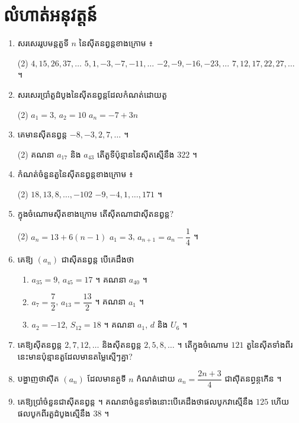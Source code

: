 \section*{លំហាត់អនុវត្តន៍}
\begin{enumerate}[1]
  \item សរសេររូបមន្តតួទី $n$ នៃស៊ីតនព្វន្តខាងក្រោម ៖
  \begin{tasks}(2)
    \task $4, 15, 26, 37, \ldots$
    \task $5, 1, -3, -7, -11, \ldots$
    \task $-2, -9, -16, -23, \ldots$
    \task $7, 12, 17, 22, 27, \ldots$ ។
  \end{tasks}
  \item សរសេរប្រាំតួដំបូងនៃស៊ីតនព្វន្តដែលកំណត់ដោយតួ
  \begin{tasks}(2)
    \task $a_1 = 3$, $a_2 = 10$
    \task $a_n = -7 + 3n$
  \end{tasks}
  \item គេមានស៊ីតនព្វន្ត $-8, -3, 2, 7, \ldots$ ។
  \begin{tasks}(2)
    \task គណនា $a_{17}$ និង $a_{43}$
    \task តើតួទីប៉ុន្មាននៃស៊ីតស្មើនឹង $322$ ។
  \end{tasks}
  \item កំណត់ចំនួនតួនៃស៊ីតនព្វន្តខាងក្រោម ៖
  \begin{tasks}(2)
    \task $18, 13, 8, \ldots, -102$
    \task $-9, -4, 1, \ldots, 171$ ។
  \end{tasks}
  \item ក្នុងចំណោមស៊ីតខាងក្រោម តើស៊ីតណាជាស៊ីតនព្វន្ត?
  \begin{tasks}(2)
    \task $a_n = 13 + 6(n - 1)$
    \task $a_1 = 3$, $a_{n+1} = a_n - \dfrac{1}{4}$ ។
  \end{tasks}
  \item គេឱ្យ $(a_n)$ ជាស៊ីតនព្វន្ត បើគេដឹងថា
  \begin{enumerate}[a]
    \item $a_{35} = 9$, $a_{45} = 17$ ។ គណនា $a_{40}$ ។
    \item $a_7 = \dfrac{7}{2}$, $a_{13} = \dfrac{13}{2}$ ។ គណនា $a_1$ ។
    \item $a_2 = -12$, $S_{12} = 18$ ។ គណនា $a_1$, $d$ និង $U_6$ ។
  \end{enumerate}
  \item គេឱ្យស៊ីតនព្វន្ត $2, 7, 12, \ldots$ និងស៊ីតនព្វន្ត $2, 5, 8, \ldots$ ។ តើក្នុងចំណោម $121$ តួនៃស៊ីតទាំងពីរនេះមានប៉ុន្មានតួដែលមានតម្លៃស្មើៗគ្នា?
  \item បង្ហាញថាស៊ីត $(a_n)$ ដែលមានតួទី $n$ កំណត់ដោយ $a_n = \dfrac{2n+3}{4}$ ជាស៊ីតនព្វន្តកើន ។
  \item គេឱ្យប្រាំចំនួនជាស៊ីតនព្វន្ត ។ គណនាចំនួនទាំងនោះបើគេដឹងថាផលបូកវាស្មើនឹង $125$ ហើយផលបូកពីរតួដំបូងស្មើនឹង $38$ ។

\end{enumerate}
